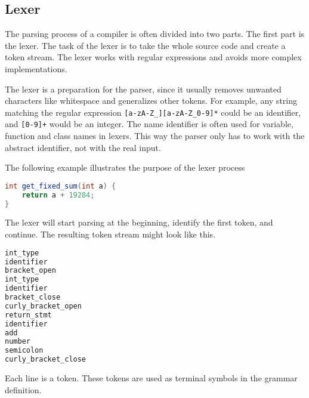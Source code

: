 
\subsection{Lexer}

The parsing process of a compiler is often divided into two parts. The first part is the lexer. 
The task of the lexer is to take the whole source code and create a token stream. 
The lexer works with regular expressions and avoids more complex implementations.

The lexer is a preparation for the parser, since it usually removes unwanted characters like whitespace and generalizes other tokens.
For example, any string matching the regular expression \verb|[a-zA-Z_][a-zA-Z_0-9]*| could be an identifier, and \verb|[0-9]+| would be an integer. 
The name identifier is often used for variable, function and class names in lexers. 
This way the parser only has to work with the abstract identifier, not with the real input.

The following example illustrates the purpose of the lexer process
\begin{lstlisting}[language=Java, caption="Example input for the lexer"]
int get_fixed_sum(int a) {
    return a + 19284;
}
\end{lstlisting}

The lexer will start parsing at the beginning, identify the first token, and continue. The resulting token stream might look like this.

\begin{lstlisting}[language=Java, caption="Example output of the lexer"]
int_type 
identifier
bracket_open
int_type
identifier
bracket_close
curly_bracket_open
return_stmt
identifier
add
number
semicolon
curly_bracket_close
\end{lstlisting}

Each line is a token. These tokens are used as terminal symbols in the grammar definition.